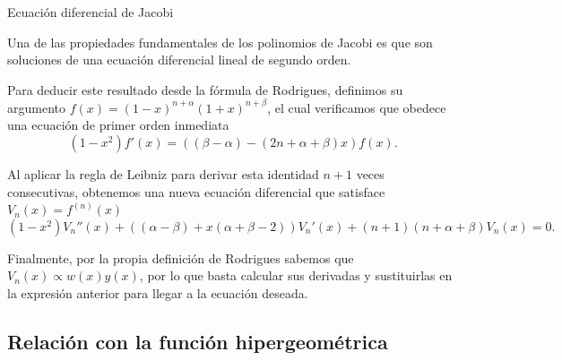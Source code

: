 \documentclass[xcolor=dvipsnames,10pt]{beamer}
\newcommand{\rioja}[1]{\textcolor[RGB]{115,0,60}{#1}}
\begin{document}
\begin{frame}{Ecuación diferencial de Jacobi}

    Una de las propiedades fundamentales de los polinomios de Jacobi es que son soluciones de una ecuación diferencial lineal de segundo orden.

    \vspace{0.1cm}

    \vspace{0.1cm}
    \begin{overprint}
        Para deducir este resultado desde la fórmula de Rodrigues, definimos su argumento $f(x) = (1-x)^{n+\alpha}(1+x)^{n+\beta}$, el cual verificamos que obedece una ecuación de primer orden inmediata
        \[
        (1-x^2)f'(x) = ((\beta - \alpha) - (2n + \alpha + \beta)x)f(x).
        \]

        Al aplicar la \rioja{regla de Leibniz} para derivar esta identidad $n+1$ veces consecutivas, obtenemos una nueva ecuación diferencial que satisface $V_n(x) = f^{(n)}(x)$
        \[
        (1-x^2)V_n''(x) + ((\alpha - \beta) + x(\alpha + \beta - 2))V_n'(x) + (n+1)(n + \alpha + \beta)V_n(x) = 0.
        \]

        Finalmente, por la propia definición de Rodrigues sabemos que $V_n(x) \propto w(x)y(x)$, por lo que basta calcular sus derivadas y sustituirlas en la expresión anterior para llegar a la ecuación deseada.
    \end{overprint}
\end{frame}

\subsection{Relación con la función hipergeométrica}
\end{document}
